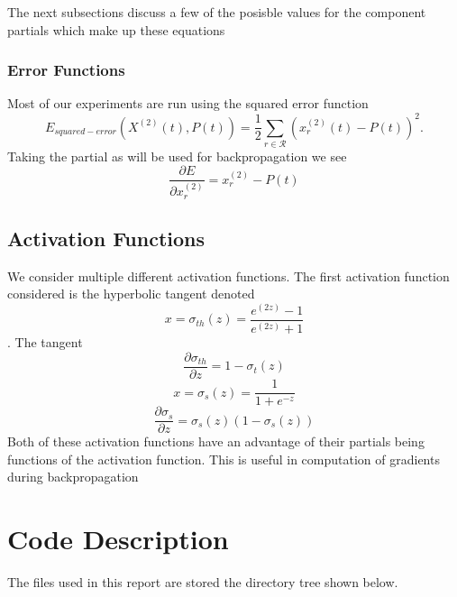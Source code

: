 \documentclass{article}
\begin{document}
The next subsections discuss a few of the posisble values for the component partials which make up these equations

\subsubsection{Error Functions}\label{error}
Most of our experiments are run using the squared error function
\begin{equation}
E_{squared-error}(X^{(2)}(t), P(t)) =  \frac{1}{2}\sum_{r\in\mathcal{R}}(x^{(2)}_{r}(t)-P(t))^2.
\end{equation}
Taking the partial as will be used for backpropagation we see
\begin{equation}
\frac{\partial E}{\partial x_r^{(2)}}= x^{(2)}_{r}-P(t)
\end{equation}

\subsection{Activation Functions}\label{activation}
We consider multiple different activation functions.
The first activation function considered is the hyperbolic tangent denoted
\begin{equation}
x = \sigma_{th}(z) = \frac{e^{(2z)}-1}{e^{(2z)}+1}
\end{equation}.
The tangent
\begin{equation}
\frac{\partial \sigma_{th}}{\partial z} = 1 - \sigma_{t}(z)
\end{equation}
\begin{equation}
x = \sigma_{s}(z) = \frac{1}{1+e^{-z}}
\end{equation}
\begin{equation}
\frac{\partial \sigma_{s}}{\partial z} = \sigma_{s}(z)(1-\sigma_{s}(z))
\end{equation}
Both of these activation functions have an advantage of their partials being functions of the activation function.  This is useful in computation of gradients during backpropagation 

\pagebreak
\section{Code Description}
The files used in this report are stored the directory tree shown below.
\end{document}
